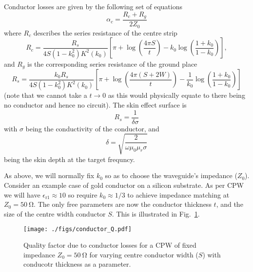 Conductor losses are given by the following set of equations\cite{Simons2004}
\begin{equation}
  \alpha_c = \frac{R_c +R_g}{2Z_0}
\end{equation}
where $R_c$ describes the series resistance of the centre strip
\begin{equation}
  R_c = \frac{R_s}{4 S(1-k_0^2)K^2(k_0)}\left[ \pi + \log\left(\frac{4\pi
  S}{t}\right) - k_0\log\left(\frac{1+k_0}{1-k_0}\right) \right],
\end{equation}
and $R_g$ is the corresponding series resistance of the ground place
\begin{equation}
  R_s = \frac{k_0 R_s}{4S(1-k_0^2)K^2(k_0)}\left[\pi +
  \log\left(\frac{4\pi(S+2W)}{t}\right) -
  \frac{1}{k_0}\log\left(\frac{1+k_0}{1-k_0}\right)\right]
\end{equation}
(note that we cannot take a $t\to 0$ as this would physically equate to there
being no conductor and hence no circuit). The skin effect surface is
\begin{equation}
  R_s = \frac{1}{\delta\sigma}
\end{equation}
with $\sigma$ being the conductivity of the conductor, and
\begin{equation}
  \delta = \sqrt{\frac{2}{\omega\mu_0\mu_r\sigma}}
\end{equation}
being the skin depth at the target frequncy.



As above, we will normally fix $k_0$ so as to choose the waveguide's impedance
($Z_0$). Consider an example case of gold conductor on a silicon substrate. As
per CPW\cite{1127105}  we will have $\epsilon_\mathrm{r1} \approx 10$ so require $k_0
\approx 1/3$ to achieve impedance matching at $Z_0 = \SI{50}{\ohm}$. The only
free parameters are now the conductor thickness $t$, and the size of the centre
width conductor $S$. This is illustrated in Fig.~\ref{fig:conductorQ}.

\begin{figure}
  \texttt{[image: ./figs/conductor\_Q.pdf]}
  \caption{Quality factor due to conductor losses for a CPW of fixed impedance
  $Z_0=\SI{50}{\ohm}$ for varying centre conductor width ($S$) with conducotr
  thickness as a parameter.}
  \label{fig:conductorQ}
\end{figure}

